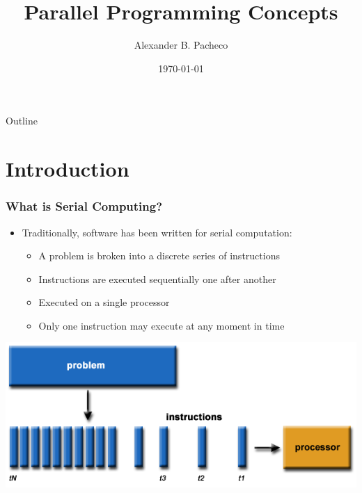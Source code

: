 \documentclass[10pt,t]{beamer}
\title{Parallel Programming Concepts}
\subtitle{}
\author{Alexander B. Pacheco}
\institute{\href{http://researchcomputing.lehigh.edu}{LTS Research Computing}}
\date{\today}
\begin{document}
\begin{frame}
  \titlepage
\end{frame}

\begin{frame}[c]{Outline}
  \tableofcontents
\end{frame}

\section{Introduction}
\begin{frame}
  \frametitle{What is Serial Computing?}
  \begin{itemize}
  \item Traditionally, software has been written for serial computation:
    \begin{itemize}
    \item A problem is broken into a discrete series of instructions
    \item Instructions are executed sequentially one after another
    \item Executed on a single processor
    \item Only one instruction may execute at any moment in time
    \end{itemize}
  \end{itemize}
  \includegraphics[width=\textwidth]{./serialProblem}
\end{frame}
\end{document}
